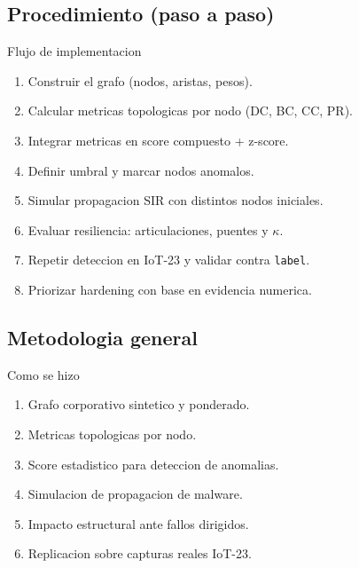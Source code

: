 \subsection{Procedimiento (paso a
paso)}\label{procedimiento-paso-a-paso}

\begin{frame}[fragile]{Flujo de implementacion}
\protect{}\label{flujo-de-implementacion}
\begin{enumerate}
\tightlist
\item
  Construir el grafo (nodos, aristas, pesos).
\item
  Calcular metricas topologicas por nodo (DC, BC, CC, PR).
\item
  Integrar metricas en score compuesto + z-score.
\item
  Definir umbral y marcar nodos anomalos.
\item
  Simular propagacion SIR con distintos nodos iniciales.
\item
  Evaluar resiliencia: articulaciones, puentes y \(\kappa\).
\item
  Repetir deteccion en IoT-23 y validar contra \texttt{label}.
\item
  Priorizar hardening con base en evidencia numerica.
\end{enumerate}
\end{frame}

\subsection{Metodologia general}\label{metodologia-general}

\begin{frame}{Como se hizo}
\protect{}\label{como-se-hizo}
\begin{enumerate}
\tightlist
\item
  Grafo corporativo sintetico y ponderado.
\item
  Metricas topologicas por nodo.
\item
  Score estadistico para deteccion de anomalias.
\item
  Simulacion de propagacion de malware.
\item
  Impacto estructural ante fallos dirigidos.
\item
  Replicacion sobre capturas reales IoT-23.
\end{enumerate}
\end{frame}

